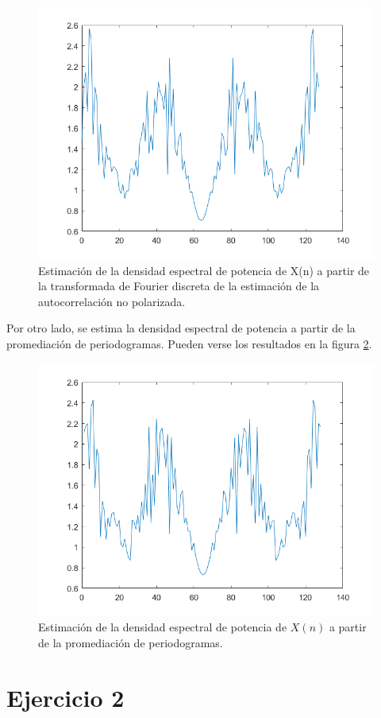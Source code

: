 \begin{figure}[H] %
\centering
\includegraphics[scale=0.45]{../EJ1/densidadEspectralFourierDiscNP}
\caption{Estimaci\'on de la densidad espectral de potencia  de X(n) a partir de la transformada de Fourier discreta de la estimaci\'on de la autocorrelación no polarizada.}
\label{densidadEs}
\end{figure}

Por otro lado, se estima la densidad espectral de potencia a partir de la promediaci\'on de periodogramas. Pueden verse los resultados en la figura \ref{perio}.

\begin{figure}[H] %
\centering
\includegraphics[scale=0.45]{../EJ1/periodogramaNP}
\caption{Estimaci\'on de la densidad espectral de potencia de $X(n)$ a partir de la promediaci\'on de periodogramas.}
\label{perio}
\end{figure}


\section*{Ejercicio 2}




